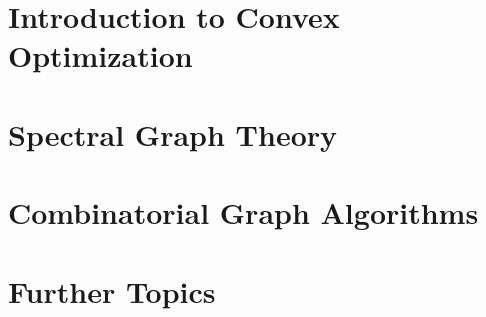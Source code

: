 \documentclass[12pt,a4paper,openany]{book}
\begin{document}
\newpage

\tableofcontents





\label{part:intro}


\part{Introduction to Convex Optimization}
\label{part:convex}




\part{Spectral Graph Theory}
\label{part:sg}










\part{Combinatorial Graph Algorithms}
\label{part:combinatorial}






\part{Further Topics}
\label{part:more}



% 



\end{document}
